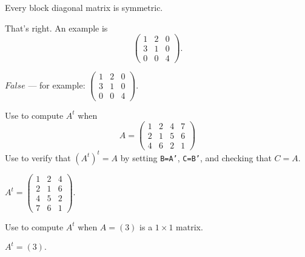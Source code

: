 \documentclass{ximera}
\begin{document}
\begin{exercise} \label{c1.3.4c}
  Every block diagonal matrix is symmetric.
  \begin{multipleChoice}
  \end{multipleChoice}
  \begin{feedback}
    That's right.   An example is
    \[ \left(\begin{array}{ccc}
               1 & 2 & 0 \\
               3 & 1 & 0 \\
               0 & 0 & 4
             \end{array}\right).
         \]
  \end{feedback}  

\begin{solution}
$False$ --- for example:
$\left(\begin{array}{ccc}
1 & 2 & 0 \\
3 & 1 & 0 \\
0 & 0 & 4
\end{array}\right)$.

\end{solution}
\end{exercise}

\CEXER

\begin{exercise} \label{c1.3.5a}
Use \Matlab to compute $A^t$ when
\begin{equation} 
A = \left(\begin{array}{cccc} 
1 & 2 & 4 & 7 \\ 2 & 1 & 5 & 6 \\  4 & 6 & 2 & 1 
\end{array}\right)
\end{equation}
Use \Matlab to verify that $(A^t)^t=A$ by setting {\tt B=A'}, {\tt C=B'},
and checking that $C=A$.

\begin{solution}
\ans $A^t =
\left(\begin{array}{rrr}
1 & 2 & 4 \\
2 & 1 & 6 \\
4 & 5 & 2 \\
7 & 6 & 1
\end{array}\right).$

\end{solution}
\end{exercise}

\begin{exercise} \label{c1.3.5b}
Use \Matlab to compute $A^t$ when $A=(3)$ is a $1\times 1$ matrix.

\begin{solution}
\ans $A^t = (3).$




\end{solution}
\end{exercise}
\end{document}
